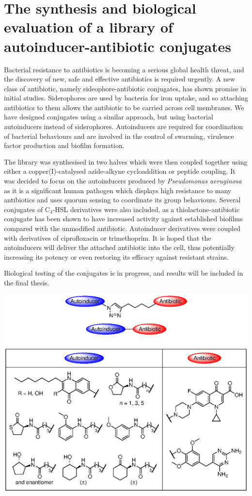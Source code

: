 \documentclass[10pt,a4paper]{article}
\begin{document}
\section*{The synthesis and biological evaluation of a library of autoinducer-antibiotic conjugates}

Bacterial resistance to antibiotics is becoming a serious global health threat, and the discovery of new, safe and effective antibiotics is required urgently. A new class of antibiotic, namely sideophore-antibiotic conjugates, has shown promise in initial studies. Siderophores are used by bacteria for iron uptake, and so attaching antibiotics to them allows the antibiotic to be carried across cell membranes. We have designed conjugates using a similar approach, but using bacterial autoinducers instead of siderophores. Autoinducers are required for coordination of bacterial behaviours and are involved in the control of swarming, virulence factor production and biofilm formation. 

The library was synthesised in two halves which were then coupled together using either a copper(I)-catalysed azide-alkyne cycloaddition or peptide coupling. It was decided to focus on the autoinducers produced by \textit{Pseudomonas aeruginosa} as it is a significant human pathogen which displays high resistance to many antibiotics and uses quorum sensing to coordinate its group behaviours.
Several conjugates of  C$_4$-HSL derivatives were also included, as a thiolactone-antibiotic conjugate has been shown to have increased activity against established biofilms compared with the unmodified antibiotic.
Autoinducer derivatives were coupled with derivatives of ciprofloxacin or trimethoprim. It is hoped that the autoinducers will deliver the attached antibiotic into the cell, thus potentially increasing its potency or even restoring its efficacy against resistant strains.

Biological testing of the conjugates is in progress, and results will be included in the final thesis.
	
\begin{scheme}[H]
	\begin{center}
		\includegraphics[width=\linewidth]{Summary_1}
	\end{center}
\end{scheme}
\end{document}
